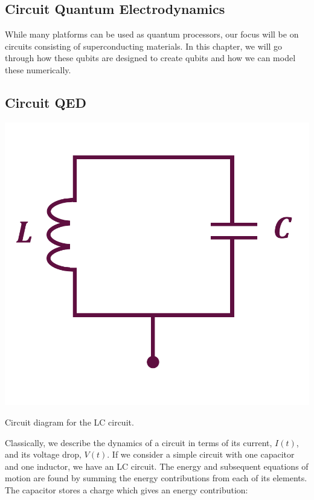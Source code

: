 \begin{fullwidth}
\chapter{Circuit Quantum Electrodynamics}\label{chap:cQED}
\end{fullwidth}
While many platforms can be used as quantum processors, our focus will be on circuits consisting of superconducting materials. In this chapter, we will go through how these qubits are designed to create qubits and how we can model these numerically. \\

\section{Circuit QED}
\begin{marginfigure}[5 cm]
    \includegraphics[width = \linewidth]{tex/fig_for_text/LC_circuit.png}
    \caption{Circuit diagram for the LC circuit.}
\end{marginfigure}
Classically, we describe the dynamics of a circuit in terms of its current, $I(t)$, and its voltage drop, $V(t)$. If we consider a simple circuit with one capacitor and one inductor, we have an LC circuit. The energy and subsequent equations of motion are found by summing the energy contributions from each of its elements. The capacitor stores a charge which gives an energy contribution:
